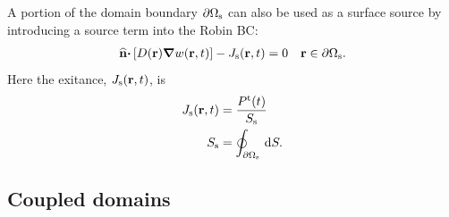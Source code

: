 \documentclass[a4paper]{article}
\numberwithin{equation}{section}
\providecommand\oiint{\oint}
\begin{document}
A portion of the domain boundary $\partial\Omega_{\mathrm{s}}$ can also be used as a
surface source by introducing a source term into the Robin BC:
\begin{align}
\begin{matrix}
\widehat{\boldsymbol{\mathrm{n}}}\boldsymbol{\mathrm{\cdot}}\left[D(\boldsymbol{\mathrm{r}})\boldsymbol{\mathrm{\nabla}} w(\boldsymbol{\mathrm{r}},t)\right] - J_{\mathrm{s}}(\boldsymbol{\mathrm{r}},t) = 0 &\boldsymbol{\mathrm{r}}\in\partial\Omega_{\mathrm{s}}.
\end{matrix}
\end{align}
Here the exitance, $J_{\mathrm{s}}(\boldsymbol{\mathrm{r}},t)$, is
\begin{align}
J_\rs\prt &= \frac{P^\rt(t)}{S_\rs} \\
S_\rs &= \oiint_{\partial\Omega_\rs}\dif{S} .
\end{align}

\subsection[Coupled domains]{Coupled domains}
\label{sc:sum:coup}
\end{document}
